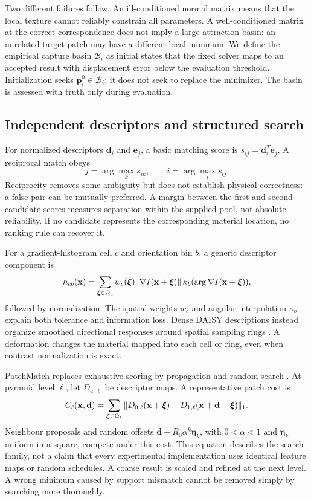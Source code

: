 Two different failures follow. An ill-conditioned normal matrix means that the local texture cannot reliably constrain all parameters. A well-conditioned matrix at the correct correspondence does not imply a large attraction basin: an unrelated target patch may have a different local minimum. We define the empirical capture basin $\mathcal B_i$ as initial states that the fixed solver maps to an accepted result with displacement error below the evaluation threshold. Initialization seeks $\mathbf p_i^0\in\mathcal B_i$; it does not seek to replace the minimizer. The basin is assessed with truth only during evaluation.

\subsection{Independent descriptors and structured search}
For normalized descriptors $\mathbf d_i$ and $\mathbf e_j$, a basic matching score is $s_{ij}=\mathbf d_i^T\mathbf e_j$. A reciprocal match obeys
\begin{equation}
j=\arg\max_k s_{ik},\qquad i=\arg\max_l s_{lj}.
\end{equation}
Reciprocity removes some ambiguity but does not establish physical correctness: a false pair can be mutually preferred. A margin between the first and second candidate scores measures separation within the supplied pool, not absolute reliability. If no candidate represents the corresponding material location, no ranking rule can recover it.

For a gradient-histogram cell $c$ and orientation bin $b$, a generic descriptor component is
\begin{equation}
h_{cb}(\mathbf x)=\sum_{\boldsymbol\xi\in\Omega_c}w_c(\boldsymbol\xi)
\|\nabla I(\mathbf x+\boldsymbol\xi)\|\,\kappa_b(\arg\nabla I(\mathbf x+\boldsymbol\xi)),
\end{equation}
followed by normalization. The spatial weights $w_c$ and angular interpolation $\kappa_b$ explain both tolerance and information loss. Dense DAISY descriptions instead organize smoothed directional responses around spatial sampling rings \citep{daisy}. A deformation changes the material mapped into each cell or ring, even when contrast normalization is exact.

PatchMatch replaces exhaustive scoring by propagation and random search \citep{barnes,hu}. At pyramid level $\ell$, let $D_{a,\ell}$ be descriptor maps. A representative patch cost is
\begin{equation}
C_\ell(\mathbf x,\mathbf d)=\sum_{\boldsymbol\xi\in\Omega_\ell}
\|D_{0,\ell}(\mathbf x+\boldsymbol\xi)-D_{1,\ell}(\mathbf x+\mathbf d+\boldsymbol\xi)\|_1.
\end{equation}
Neighbour proposals and random offsets $\mathbf d+R_0\alpha^k\boldsymbol\eta_k$, with $0<\alpha<1$ and $\boldsymbol\eta_k$ uniform in a square, compete under this cost. This equation describes the search family, not a claim that every experimental implementation uses identical feature maps or random schedules. A coarse result is scaled and refined at the next level. A wrong minimum caused by support mismatch cannot be removed simply by searching more thoroughly.

